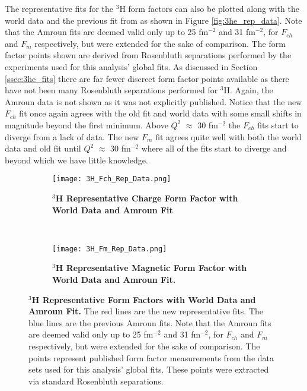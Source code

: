 The representative fits for the $^3$H form factors can also be plotted along with the world data and the previous fit from \cite{Article:Amroun} as shown in Figure \ref{fig:3he_rep_data}. Note that the Amroun fits are deemed valid only up to 25 fm$^{-2}$ and 31 fm$^{-2}$, for $F_{ch}$ and $F_m$ respectively, but were extended for the sake of comparison. The form factor points shown are derived from Rosenbluth separations performed by the experiments used for this analysis' global fits. As discussed in Section \ref{ssec:3he_fits} there are far fewer discreet form factor points available as there have not been many Rosenbluth separations performed for $^3$H. Again, the Amroun data is not shown as it was not explicitly published. Notice that the new $F_{ch}$ fit once again agrees with the old fit and world data with some small shifts in magnitude beyond the first minimum. Above $Q^2$ $\approx$ 30 fm$^{-2}$ the $F_{ch}$ fits start to diverge from a lack of data. The new $F_m$ fit agrees quite well with both the world data and old fit until $Q^2$ $\approx$ 30 fm$^{-2}$ where all of the fits start to diverge and beyond which we have little knowledge. 

 \begin{figure}[!ht]
\begin{subfigure}{1.\textwidth}
  \centering
  \texttt{[image: 3H\_Fch\_Rep\_Data.png]}
  \caption{\bf{$^3$H Representative Charge Form Factor with World Data and Amroun Fit}}
  \label{fig:3h_fch_rep_data}
\end{subfigure}\\
\begin{subfigure}{1.\textwidth}
  \centering
  \texttt{[image: 3H\_Fm\_Rep\_Data.png]}
  \caption{\bf{$^3$H Representative Magnetic Form Factor with World Data and Amroun Fit.}}
  \label{fig:3h_fm_rep_data}
\end{subfigure}
\caption[$^3$H Representative Form Factors with World Data and Amroun Fit] {
{\bf{$^3$H Representative Form Factors with World Data and Amroun Fit.}} The red lines are the new representative fits. The blue lines are the previous Amroun fits. Note that the Amroun fits are deemed valid only up to 25 fm$^{-2}$ and 31 fm$^{-2}$, for $F_{ch}$ and $F_m$ respectively, but were extended for the sake of comparison. The points represent published form factor measurements from the data sets used for this analysis' global fits. These points were extracted via standard Rosenbluth separations.}
\label{fig:3h_rep_data}
\end{figure}

